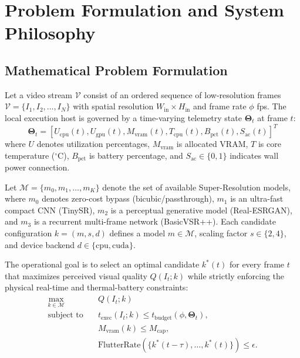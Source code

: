 \documentclass[conference]{IEEEtran}
\begin{document}
\section{Problem Formulation and System Philosophy}

\subsection{Mathematical Problem Formulation}
Let a video stream $\mathcal{V}$ consist of an ordered sequence of low-resolution frames $\mathcal{V} = \{I_1, I_2, \dots, I_N\}$ with spatial resolution $W_{\text{in}} \times H_{\text{in}}$ and frame rate $\phi$ fps. The local execution host is governed by a time-varying telemetry state $\mathbf{\Theta}_t$ at frame $t$:
\begin{equation}
\mathbf{\Theta}_t = [U_{\text{cpu}}(t), U_{\text{gpu}}(t), M_{\text{vram}}(t), T_{\text{cpu}}(t), B_{\text{pct}}(t), S_{\text{ac}}(t)]^T
\end{equation}
where $U$ denotes utilization percentages, $M_{\text{vram}}$ is allocated VRAM, $T$ is core temperature ($^{\circ}\text{C}$), $B_{\text{pct}}$ is battery percentage, and $S_{\text{ac}} \in \{0, 1\}$ indicates wall power connection.

Let $\mathcal{M} = \{m_0, m_1, \dots, m_K\}$ denote the set of available Super-Resolution models, where $m_0$ denotes zero-cost bypass (bicubic/passthrough), $m_1$ is an ultra-fast compact CNN (TinySR), $m_2$ is a perceptual generative model (Real-ESRGAN), and $m_3$ is a recurrent multi-frame network (BasicVSR++). Each candidate configuration $k = (m, s, d)$ defines a model $m \in \mathcal{M}$, scaling factor $s \in \{2, 4\}$, and device backend $d \in \{\text{cpu}, \text{cuda}\}$.

The operational goal is to select an optimal candidate $k^*(t)$ for every frame $t$ that maximizes perceived visual quality $Q(I_t; k)$ while strictly enforcing the physical real-time and thermal-battery constraints:
\begin{equation}
\begin{aligned}
\max_{k \in \mathcal{M}} \quad & Q(I_t; k) \\
\text{subject to} \quad & t_{\text{exec}}(I_t; k) \le t_{\text{budget}}(\phi, \mathbf{\Theta}_t), \\
& M_{\text{vram}}(k) \le M_{\text{cap}}, \\
& \text{FlutterRate}(\{k^*(t-\tau), \dots, k^*(t)\}) \le \epsilon.
\end{aligned}
\end{equation}
\end{document}
